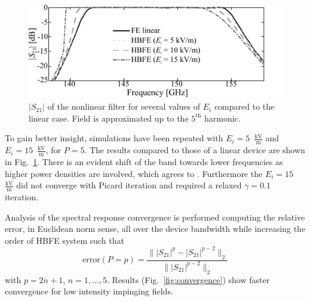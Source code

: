 \begin{figure}[!ht]
\centering
\includegraphics[width=14.8cm]{spectrumS21b}
\caption{$|S_{21}|$ of the nonlinear filter for
several values of $E_i$ compared to the linear case. Field is approximated
up to the $5^\mathrm{th}$ harmonic.}
\label{fig:spectrum}
\end{figure}

To gain better insight, simulations have
been repeated with $E_i=5$~${\frac{\mathrm{kV}}{\mathrm{m}}}$ and $E_i=15$~${\frac{\mathrm{kV}}{\mathrm{m}}}$, for $P=5$. 
The results compared to those of a linear device are shown in Fig.~\ref{fig:spectrum}. 
There is an evident shift of the band 
towards lower frequencies as higher power densities are involved, which agrees 
to \cite{Yatsyk2006}. Furthermore the $E_i=15$~${\frac{\mathrm{kV}}{\mathrm{m}}}$ did not 
converge with Picard iteration and required a relaxed $\gamma = 0.1$ iteration.

Analysis of the spectral response convergence is performed computing the relative
error, in Euclidean norm sense, all over the device bandwidth while increasing 
the order of HBFE system such that
\begin{equation} \label{eq:convError}
	\mathrm{error}(P=p) = \frac{\| |S_{21}|^{p} - |S_{21}|^{p-2}\|_2}
	{\| |S_{21}|^{p-2}\|_2} 
\end{equation}
\noindent with $p = 2n+1$, $n=1,\ldots,5$. Results (Fig.~\ref{fig:convergence})
show faster convergence for low intensity impinging fields.

